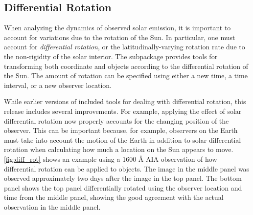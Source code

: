 \subsection{Differential Rotation}
\label{sec:differential_rotation}



When analyzing the dynamics of observed solar emission, it is important to account for variations due to the rotation of the Sun.
In particular, one must account for \textit{differential rotation}, or the latitudinally-varying rotation rate due to the non-rigidity of the solar interior.
The  subpackage provides tools for transforming both  coordinate and  objects according to the differential rotation of the Sun.
The amount of rotation can be specified using either a new time, a time interval, or a new observer location.

While earlier versions of \sunpy included tools for dealing with differential rotation, this release includes several improvements.
For example, applying the effect of solar differential rotation now properly accounts for the changing position of the observer.
This can be important because, for example, observers on the Earth must take into account the motion of the Earth in addition to solar differential rotation when calculating how much a location on the Sun appears to move.
\autoref{fig:diff_rot} shows an example using a 1600 \AA{} AIA observation of how differential rotation can be applied to  objects.
The image in the middle panel was observed approximately two days after the image in the top panel.
The bottom panel shows the top panel differentially rotated using the observer location and time from the middle panel, showing the good agreement with the actual observation in the middle panel.

